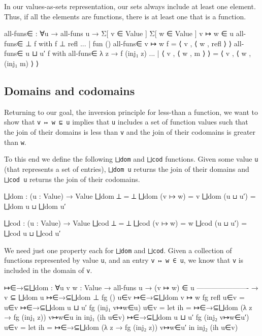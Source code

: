 In our values-as-sets representation, our sets always include at least
one element. Thus, if all the elements are functions, there is at least
one that is a function.

\begin{fence}
\begin{code}
all-funs∈ : ∀{u}
      → all-funs u
      → Σ[ v ∈ Value ] Σ[ w ∈ Value ] v ↦ w ∈ u
all-funs∈ {⊥} f with f {⊥} refl
... | fun ()
all-funs∈ {v ↦ w} f = ⟨ v , ⟨ w , refl ⟩ ⟩
all-funs∈ {u ⊔ u′} f
    with all-funs∈ λ z → f (inj₁ z)
... | ⟨ v , ⟨ w , m ⟩ ⟩ = ⟨ v , ⟨ w , (inj₁ m) ⟩ ⟩
\end{code}
\end{fence}

\hypertarget{domains-and-codomains}{%
\subsection{Domains and codomains}\label{domains-and-codomains}}

Returning to our goal, the inversion principle for less-than a function,
we want to show that \texttt{v\ ↦\ w\ ⊑\ u} implies that \texttt{u}
includes a set of function values such that the join of their domains is
less than \texttt{v} and the join of their codomains is greater than
\texttt{w}.

To this end we define the following \texttt{⨆dom} and \texttt{⨆cod}
functions. Given some value \texttt{u} (that represents a set of
entries), \texttt{⨆dom\ u} returns the join of their domains and
\texttt{⨆cod\ u} returns the join of their codomains.

\begin{fence}
\begin{code}
⨆dom : (u : Value) → Value
⨆dom ⊥  = ⊥
⨆dom (v ↦ w) = v
⨆dom (u ⊔ u′) = ⨆dom u ⊔ ⨆dom u′

⨆cod : (u : Value) → Value
⨆cod ⊥  = ⊥
⨆cod (v ↦ w) = w
⨆cod (u ⊔ u′) = ⨆cod u ⊔ ⨆cod u′
\end{code}
\end{fence}

We need just one property each for \texttt{⨆dom} and \texttt{⨆cod}.
Given a collection of functions represented by value \texttt{u}, and an
entry \texttt{v\ ↦\ w\ ∈\ u}, we know that \texttt{v} is included in the
domain of \texttt{v}.

\begin{fence}
\begin{code}
↦∈→⊆⨆dom : ∀{u v w : Value}
          → all-funs u  →  (v ↦ w) ∈ u
            ----------------------
          → v ⊆ ⨆dom u
↦∈→⊆⨆dom {⊥} fg () u∈v
↦∈→⊆⨆dom {v ↦ w} fg refl u∈v = u∈v
↦∈→⊆⨆dom {u ⊔ u′} fg (inj₁ v↦w∈u) u∈v =
   let ih = ↦∈→⊆⨆dom (λ z → fg (inj₁ z)) v↦w∈u in
   inj₁ (ih u∈v)
↦∈→⊆⨆dom {u ⊔ u′} fg (inj₂ v↦w∈u′) u∈v =
   let ih = ↦∈→⊆⨆dom (λ z → fg (inj₂ z)) v↦w∈u′ in
   inj₂ (ih u∈v)
\end{code}
\end{fence}

